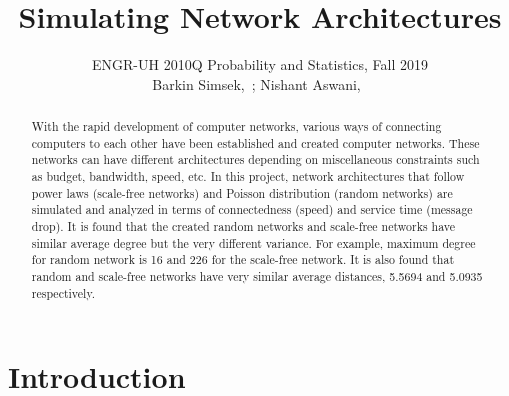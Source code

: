\documentclass[journal]{IEEEtran}
\begin{document}
{}
\setcounter{page}{1}

\title{Simulating Network Architectures}

\author{ ENGR-UH 2010Q Probability and Statistics, Fall 2019\\
\medskip
Barkin Simsek,~;
Nishant Aswani,~}%


%
{}

\maketitle

\begin{abstract}
With the rapid development of computer networks, various ways of connecting computers to each other have been established and created computer networks. These networks can have different architectures depending on miscellaneous constraints such as budget, bandwidth, speed, etc. In this project, network architectures that follow power laws (scale-free networks) and Poisson distribution (random networks) are simulated and analyzed in terms of connectedness (speed) and service time (message drop). It is found that the created random networks and scale-free networks have similar average degree but the very different variance. For example, maximum degree for random network is 16 and 226 for the scale-free network. It is also found that random and scale-free networks have very similar average distances, 5.5694 and 5.0935 respectively. 

\end{abstract}

\section{Introduction}
\end{document}
